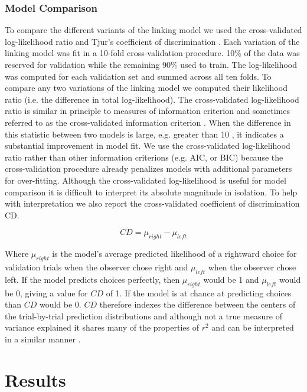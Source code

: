 \subsubsection{Model Comparison}

To compare the different variants of the linking model we used the cross-validated log-likelihood ratio and Tjur’s coefficient of discrimination \citep{Tjur2009-az}. Each variation of the linking model was fit in a 10-fold cross-validation procedure. 10\% of the data was reserved for validation while the remaining 90\% used to train. The log-likelihood was computed for each validation set and summed across all ten folds. To compare any two variations of the linking model we computed their likelihood ratio (i.e. the difference in total log-likelihood). The cross-validated log-likelihood ratio is similar in principle to measures of information criterion and sometimes referred to as the cross-validated information criterion \citep{McLachlan2000-bd}. When the difference in this statistic between two models is large, e.g. greater than 10 \citep{Burnham2004-za}, it indicates a substantial improvement in model fit. We use the cross-validated log-likelihood ratio rather than other information criterions (e.g. AIC, or BIC) because the cross-validation procedure already penalizes models with additional parameters for over-fitting. Although the cross-validated log-likelihood is useful for model comparison it is difficult to interpret its absolute magnitude in isolation. To help with interpretation we also report the cross-validated coefficient of discrimination CD. 

\begin{equation}
    CD=\mu_{right}-\mu_{left}
\end{equation}

Where $\mu_{right}$ is the model’s average predicted likelihood of a rightward choice for validation trials when the observer chose right and $\mu_{left}$ when the observer chose left. If the model predicts choices perfectly, then $\mu_{right}$ would be 1 and $\mu_{left}$ would be 0, giving a value for $CD$ of 1. If the model is at chance at predicting choices than $CD$ would be 0. $CD$ therefore indexes the difference between the centers of the trial-by-trial prediction distributions and although not a true measure of variance explained it shares many of the properties of $r^2$ and can be interpreted in a similar manner \citep{Tjur2009-az}.

\section{Results}

